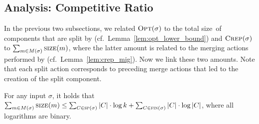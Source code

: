 
\subsection{Analysis: Competitive Ratio}
\label{sec:crep_ratio}

In the previous two subsections, we related $\textsc{Opt}(\sigma)$ to the total
size~of components that are split by \CREP
(cf.~Lemma~\ref{lem:opt_lower_bound}) and $\textsc{Crep}(\sigma)$ to $\sum_{m \in
M(\sigma)} \textsc{size}(m)$, where the latter amount is related to the merging
actions performed by \CREP (cf.~Lemma~\ref{lem:crep_mig}). Now we link
these two amounts. Note that each split action corresponds to preceding
merge actions that led to the creation of the split component.

\begin{lemma}
\label{lem:bounding_merges}
For any input $\sigma$, it holds that 
$\sum_{m \in M(\sigma)} \textsc{size}(m) 
	\leq \sum_{C \in \textsc{sp}(\sigma)} |C| \cdot \log k +
	\sum_{C \in \textsc{fin}(\sigma)} |C| \cdot \log |C|$,
where all logarithms are binary.
\end{lemma}

